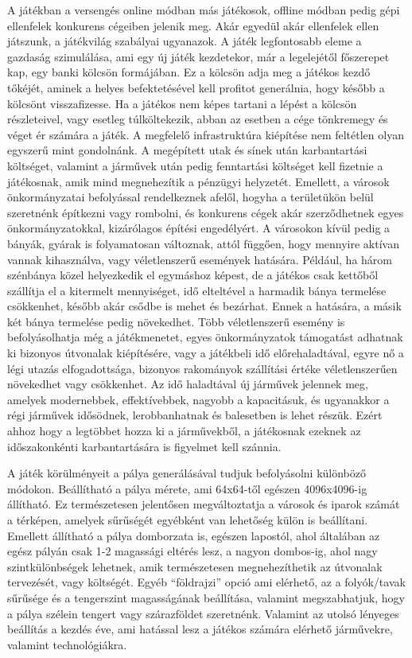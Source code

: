 A játékban a versengés online módban más játékosok, offline módban pedig gépi ellenfelek konkurens cégeiben jelenik meg. Akár egyedül akár ellenfelek ellen játszunk, a játékvilág szabályai ugyanazok. A játék legfontosabb eleme a gazdaság szimulálása, ami egy új játék kezdetekor, már a legelejétől főszerepet kap, egy banki kölcsön formájában. Ez a kölcsön adja meg a játékos kezdő tőkéjét, aminek a helyes befektetésével kell profitot generálnia, hogy később a kölcsönt visszafizesse. Ha a játékos nem képes tartani a lépést a kölcsön részleteivel, vagy esetleg túlköltekezik, abban az esetben a cége tönkremegy és véget ér számára a játék. A megfelelő infrastruktúra kiépítése nem feltétlen olyan egyszerű mint gondolnánk. A megépített utak és sínek után karbantartási költséget, valamint a járművek után pedig fenntartási költséget kell fizetnie a játékosnak, amik mind megnehezítik a pénzügyi helyzetét. Emellett, a városok önkormányzatai befolyással rendelkeznek afelől, hogyha a területükön belül szeretnénk építkezni vagy rombolni, és konkurens cégek akár szerződhetnek egyes önkormányzatokkal, kizárólagos építési engedélyért. A városokon kívül pedig a bányák, gyárak is folyamatosan változnak, attól függően, hogy mennyire aktívan vannak kihasználva, vagy véletlenszerű események hatására. Például, ha három szénbánya közel helyezkedik el egymáshoz képest, de a játékos csak kettőből szállítja el a kitermelt mennyiséget, idő elteltével a harmadik bánya termelése csökkenhet, később akár csődbe is mehet és bezárhat. Ennek a hatására, a másik két bánya termelése pedig növekedhet. Több véletlenszerű esemény is befolyásolhatja még a játékmenetet, egyes önkormányzatok támogatást adhatnak ki bizonyos útvonalak kiépítésére, vagy a játékbeli idő előrehaladtával, egyre nő a légi utazás elfogadottsága, bizonyos rakományok szállítási értéke véletlenszerűen növekedhet vagy csökkenhet. Az idő haladtával új járművek jelennek meg, amelyek modernebbek, effektívebbek, nagyobb a kapacitásuk, és ugyanakkor a régi járművek idősödnek, lerobbanhatnak és balesetben is lehet részük. Ezért ahhoz hogy a legtöbbet hozza ki a járművekből, a játékosnak ezeknek az időszakonkénti karbantartására is figyelmet kell szánnia.

A játék körülményeit a pálya generálásával tudjuk befolyásolni különböző módokon. Beállítható a pálya mérete, ami 64x64-től egészen 4096x4096-ig állítható. Ez természetesen  jelentősen megváltoztatja a városok és iparok számát a térképen, amelyek sűrűségét egyébként van lehetőség külön is beállítani. Emellett állítható a pálya domborzata is, egészen lapostól, ahol általában az egész pályán csak 1-2 magassági eltérés lesz, a nagyon dombos-ig, ahol nagy szintkülönbségek lehetnek, amik természetesen megnehezíthetik az útvonalak tervezését, vagy költségét. Egyéb “földrajzi” opció ami elérhető, az a folyók/tavak sűrűsége és a tengerszint magasságának beállítása, valamint megszabhatjuk, hogy a pálya szélein tengert vagy szárazföldet szeretnénk. Valamint az utolsó lényeges beállítás a kezdés éve, ami hatással lesz a játékos számára elérhető járművekre, valamint technológiákra.

